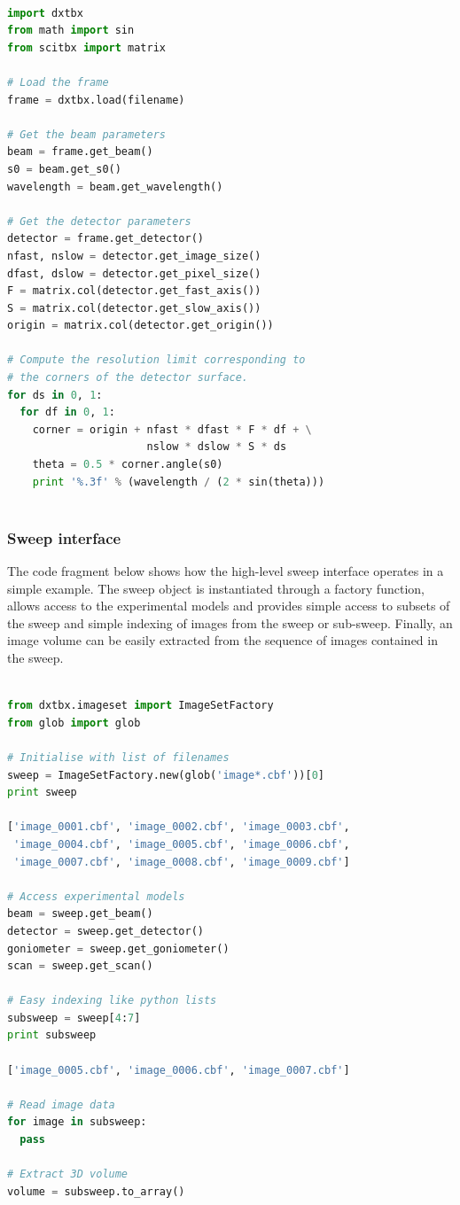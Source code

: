 \documentclass[preprint]{iucr}
\begin{document}
\begin{lstlisting}[language=Python]

import dxtbx
from math import sin
from scitbx import matrix

# Load the frame
frame = dxtbx.load(filename)

# Get the beam parameters
beam = frame.get_beam()
s0 = beam.get_s0()
wavelength = beam.get_wavelength()

# Get the detector parameters
detector = frame.get_detector()
nfast, nslow = detector.get_image_size()
dfast, dslow = detector.get_pixel_size()
F = matrix.col(detector.get_fast_axis())
S = matrix.col(detector.get_slow_axis())
origin = matrix.col(detector.get_origin())

# Compute the resolution limit corresponding to 
# the corners of the detector surface.
for ds in 0, 1:
  for df in 0, 1:
    corner = origin + nfast * dfast * F * df + \
                      nslow * dslow * S * ds
    theta = 0.5 * corner.angle(s0)
    print '%.3f' % (wavelength / (2 * sin(theta)))
    
\end{lstlisting}

\subsubsection{Sweep interface}

The code fragment below shows how the high-level sweep interface operates in a 
simple example. The sweep object is instantiated through a factory function, 
allows access to the experimental models and provides simple access to subsets 
of the sweep and simple indexing of images from the sweep or sub-sweep. Finally, 
an image volume can be easily extracted from the sequence of images contained 
in the sweep.

\begin{lstlisting}[language=Python]

from dxtbx.imageset import ImageSetFactory
from glob import glob
 
# Initialise with list of filenames
sweep = ImageSetFactory.new(glob('image*.cbf'))[0]
print sweep
 
['image_0001.cbf', 'image_0002.cbf', 'image_0003.cbf',
 'image_0004.cbf', 'image_0005.cbf', 'image_0006.cbf',
 'image_0007.cbf', 'image_0008.cbf', 'image_0009.cbf']
 
# Access experimental models
beam = sweep.get_beam()
detector = sweep.get_detector()
goniometer = sweep.get_goniometer()
scan = sweep.get_scan()
 
# Easy indexing like python lists
subsweep = sweep[4:7]
print subsweep

['image_0005.cbf', 'image_0006.cbf', 'image_0007.cbf']
 
# Read image data
for image in subsweep:
  pass
 
# Extract 3D volume
volume = subsweep.to_array()

\end{lstlisting}
\end{document}
